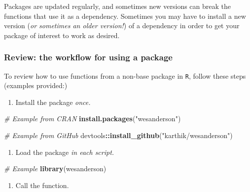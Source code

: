 \documentclass[
]{book}
\newenvironment{Shaded}{\begin{snugshade}}{\end{snugshade}}
\newcommand{\CommentTok}[1]{\textcolor[rgb]{0.56,0.35,0.01}{\textit{#1}}}
\newcommand{\FunctionTok}[1]{\textcolor[rgb]{0.13,0.29,0.53}{\textbf{#1}}}
\newcommand{\NormalTok}[1]{#1}
\newcommand{\SpecialCharTok}[1]{\textcolor[rgb]{0.81,0.36,0.00}{\textbf{#1}}}
\newcommand{\StringTok}[1]{\textcolor[rgb]{0.31,0.60,0.02}{#1}}
\providecommand{\tightlist}{%
  \setlength{\itemsep}{0pt}\setlength{\parskip}{0pt}}
\begin{document}
Packages are updated regularly, and sometimes new versions can break the functions that use it as a dependency. Sometimes you may have to install a new version (\emph{or sometimes an older version!}) of a dependency in order to get your package of interest to work as desired.

\subsubsection*{Review: the workflow for using a package}\label{review-the-workflow-for-using-a-package}

To review how to use functions from a non-base package in \texttt{R}, follow these steps (examples provided:)

\begin{enumerate}
\def\labelenumi{\arabic{enumi}.}
\tightlist
\item
  Install the package \emph{once.}
\end{enumerate}

\begin{Shaded}
\begin{Highlighting}[]
\CommentTok{\# Example from CRAN}
\FunctionTok{install.packages}\NormalTok{(}\StringTok{"wesanderson"}\NormalTok{)}

\CommentTok{\# Example from GitHub}
\NormalTok{devtools}\SpecialCharTok{::}\FunctionTok{install\_github}\NormalTok{(}\StringTok{"karthik/wesanderson"}\NormalTok{)}
\end{Highlighting}
\end{Shaded}

\begin{enumerate}
\def\labelenumi{\arabic{enumi}.}
\setcounter{enumi}{1}
\tightlist
\item
  Load the package \emph{in each script.}
\end{enumerate}

\begin{Shaded}
\begin{Highlighting}[]
\CommentTok{\# Example}
\FunctionTok{library}\NormalTok{(wesanderson)}
\end{Highlighting}
\end{Shaded}

\begin{enumerate}
\def\labelenumi{\arabic{enumi}.}
\setcounter{enumi}{2}
\tightlist
\item
  Call the function.
\end{enumerate}
\end{document}

